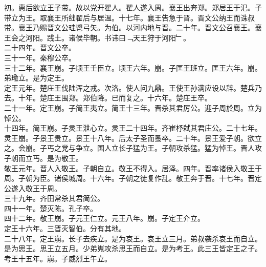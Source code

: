 \documentclass{zhvt-classic}
\begin{document}
\hspace*{2em}初。惠后欲立王子带。故以党开翟人。翟人遂入周。襄王出奔郑。郑居王于氾。子带立为王。取襄王所绌翟后与居温。十七年。襄王告急于晋。晋文公纳王而诛叔带。襄王乃赐晋文公珪鬯弓矢。为伯。以河内地与晋。二十年。晋文公召襄王。襄王会之河阳。践土。诸侯毕朝。书讳曰﹁天王狩于河阳﹂。\\
\hspace*{2em}二十四年。晋文公卒。\\
\hspace*{2em}三十一年。秦穆公卒。\\
\hspace*{2em}三十二年。襄王崩。子顷王壬臣立。顷王六年。崩。子匡王班立。匡王六年。崩。弟瑜立。是为定王。\\
\hspace*{2em}定王元年。楚庄王伐陆浑之戎。次洛。使人问九鼎。王使王孙满应设以辞。楚兵乃去。十年。楚庄王围郑。郑伯降。已而复之。十六年。楚庄王卒。\\
\hspace*{2em}二十一年。定王崩。子简王夷立。简王十三年。晋杀其君厉公。迎子周於周。立为悼公。\\
\hspace*{2em}十四年。简王崩。子灵王泄心立。灵王二十四年。齐崔杼弑其君庄公。二十七年。灵王崩。子景王贵立。景王十八年。后太子圣而蚤卒。二十年。景王爱子朝。欲立之。会崩。子丐之党与争立。国人立长子猛为王。子朝攻杀猛。猛为悼王。晋人攻子朝而立丐。是为敬王。\\
\hspace*{2em}敬王元年。晋人入敬王。子朝自立。敬王不得入。居泽。四年。晋率诸侯入敬王于周。子朝为臣。诸侯城周。十六年。子朝之徒复作乱。敬王奔于晋。十七年。晋定公遂入敬王于周。\\
\hspace*{2em}三十九年。齐田常杀其君简公。\\
\hspace*{2em}四十一年。楚灭陈。孔子卒。\\
\hspace*{2em}四十二年。敬王崩。子元王仁立。元王八年。崩。子定王介立。\\
\hspace*{2em}定王十六年。三晋灭智伯。分有其地。\\
\hspace*{2em}二十八年。定王崩。长子去疾立。是为哀王。哀王立三月。弟叔袭杀哀王而自立。是为思王。思王立五月。少弟嵬攻杀思王而自立。是为考王。此三王皆定王之子。\\
\hspace*{2em}考王十五年。崩。子威烈王午立。\\
\end{document}
